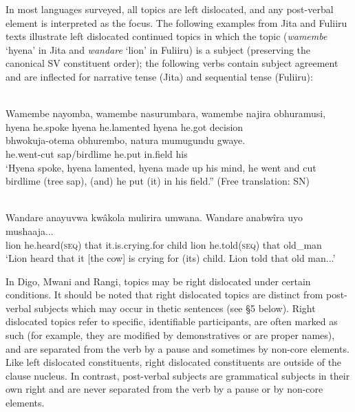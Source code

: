 \documentclass[output=paper]{langsci/langscibook}
\begin{document}
In most languages surveyed, all topics are left dislocated, and any post-verbal element is interpreted as the focus. The following examples from Jita and Fuliiru texts illustrate left dislocated continued topics in which the topic (\textit{wamembe} ‘hyena’ in Jita and \textit{wandare} ‘lion’ in Fuliiru) is a subject (preserving the canonical SV constituent order); the following verbs contain subject agreement and are inflected for narrative tense (Jita) and sequential tense (Fuliiru):

\ea\label{ex:}
\\
\gll Wamembe nayomba, wamembe nasurumbara, wamembe najira obhuramusi,\\
     hyena he.spoke hyena he.lamented hyena he.got decision\\
\gll bhwokuja-otema obhurembo, natura mumugundu gwaye.\\
he.went-cut sap/birdlime he.put in.field his\\


\upshape
‘Hyena spoke, hyena lamented, hyena made up his mind, he went and cut birdlime (tree sap), (and) he put (it) in his field.” (Free translation: SN)
\z

\ea\label{ex:}
\\
\gll Wandare anayuvwa kwâkola mulirira umwana. Wandare anabwîra uyo mushaaja...\\
lion he.heard(\textsc{seq}) that it.is.crying.for child lion he.told(\textsc{seq}) that old\_man  \\


\glt \textup{‘}\textup{Lion heard that it [the cow] is crying for (its) child. Lion told that old man...’}
\z

In Digo, Mwani and Rangi, topics may be right dislocated under certain conditions. It should be noted that right dislocated topics are distinct from post-verbal subjects which may occur in thetic sentences (see §5 below). Right dislocated topics refer to specific, identifiable participants, are often marked as such (for example, they are modified by demonstratives or are proper names), and are separated from the verb by a pause and sometimes by non-core elements. Like left dislocated constituents, right dislocated constituents are outside of the clause nucleus. In contrast, post-verbal subjects are grammatical subjects in their own right and are never separated from the verb by a pause or by non-core elements.
\end{document}

